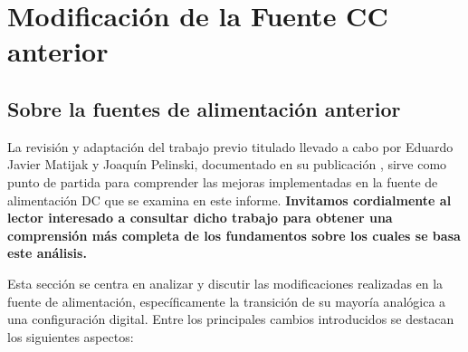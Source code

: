 \chapter{Modificación de la Fuente CC anterior}

\label{C:Sobre la fuente anterior}

\section{Sobre la fuentes de alimentación anterior}
La revisión y adaptación del trabajo previo titulado  llevado a cabo por Eduardo Javier Matijak y Joaquín Pelinski, documentado en su publicación \cite{Fuente2023}, sirve como punto de partida para comprender las mejoras implementadas en la fuente de alimentación DC que se examina en este informe. \textbf{Invitamos cordialmente al lector interesado a consultar dicho trabajo para obtener una comprensión más completa de los fundamentos sobre los cuales se basa este análisis.} \par 
Esta sección se centra en analizar y discutir las modificaciones realizadas en la fuente de alimentación, específicamente la transición de su mayoría analógica a una configuración digital. Entre los principales cambios introducidos se destacan los siguientes aspectos:

